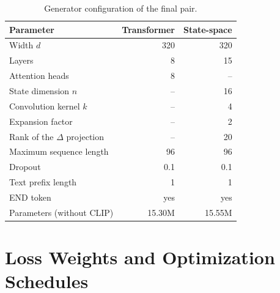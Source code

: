 \begin{table}[H]
\centering
\caption{Generator configuration of the final pair.}
\label{tab:app_generator}
\begin{tabular}{lrr}
\toprule
Parameter & Transformer & State-space \\
\midrule
Width $d$ & 320 & 320 \\
Layers & 8 & 15 \\
Attention heads & 8 & -- \\
State dimension $n$ & -- & 16 \\
Convolution kernel $k$ & -- & 4 \\
Expansion factor & -- & 2 \\
Rank of the $\Delta$ projection & -- & 20 \\
Maximum sequence length & 96 & 96 \\
Dropout & 0.1 & 0.1 \\
Text prefix length & 1 & 1 \\
END token & yes & yes \\
Parameters (without CLIP) & 15.30M & 15.55M \\
\bottomrule
\end{tabular}
\end{table}

\section{Loss Weights and Optimization Schedules}
\label{sec:app_optim}

